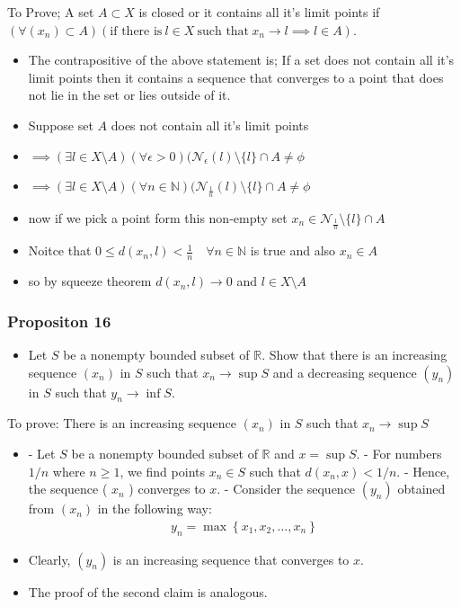 \documentclass[12pt,a4paper]{article}
\begin{document}
To Prove; A set \(A \subset X\) is closed or it contains all it's limit points if \((\forall(x_{n}) \subset A)(\text{if there is} \ l \in X \ \text{such that} \ x_{n} \to l \implies l \in A)\).
\begin{itemize}
    \item The contrapositive of the above statement is; If a set does not contain all it's limit points then it contains a sequence that converges to a point that does not lie in the set or lies outside of it.
    \item Suppose set \(A\) does not contain all it's limit points
    \item \(\implies (\exists l \in X\setminus A)(\forall \epsilon >0)(\mathcal{N}_{\epsilon}(l)\setminus \{l\}\cap A \neq \phi\)
    \item \(\implies (\exists l \in X\setminus A)(\forall n \in \mathbb{N})(\mathcal{N}_{\frac{1}{n}}(l)\setminus \{l\}\cap A \neq \phi\)
    \item now if we pick a point form this non-empty set \(x_{n} \in \mathcal{N}_{\frac{1}{n}}\setminus \{l\}\cap A\)
    \item Noitce that \(0\leq d(x_{n},l)<\frac{1}{n} \quad \forall n \in \mathbb{N}\) is true and also \(x_{n} \in A\)           
    \item so by squeeze theorem \(d(x_{n},l)\to 0\) and \(l \in X \setminus A\)    
\end{itemize}
 \subsubsection{Propositon 16} 
\begin{itemize}
    \item Let \(S\) be a nonempty bounded subset of \(\mathbb{R}\). Show that there is an increasing sequence \(\left(x_n\right)\) in \(S\) such that \(x_n \rightarrow \sup S\) and a decreasing sequence \(\left(y_n\right)\) in \(S\) such that \(y_n \rightarrow \inf S\).
\end{itemize}
To prove: There is an increasing sequence \(\left(x_n\right)\) in \(S\) such that \(x_n \rightarrow \sup S\)
\begin{itemize}
    \item - Let \(S\) be a nonempty bounded subset of \(\mathbb{R}\) and \(x=\sup S\).
    - For numbers \(1 / n\) where \(n \geq 1\), we find points \(x_n \in S\) such that \(d\left(x_n, x\right)<1 / n\).
    - Hence, the sequence ( \(x_n\) ) converges to \(x\).
    - Consider the sequence \(\left(y_n\right)\) obtained from \(\left(x_n\right)\) in the following way:
\begin{align*}
y_n=\max \left\{x_1, x_2, \ldots, x_n\right\}
\end{align*}
\item Clearly, \(\left(y_n\right)\) is an increasing sequence that converges to \(x\).
\item The proof of the second claim is analogous. 
\end{itemize}
\end{document}
